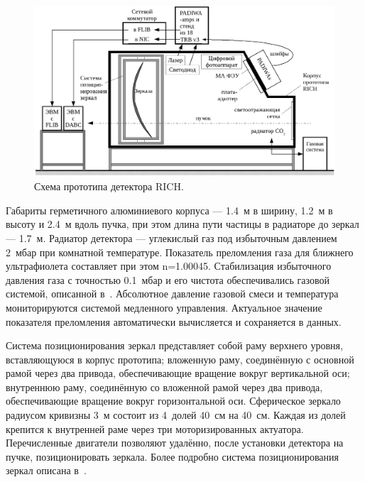 \begin{figure}[H]
\includegraphics[width=1.0\textwidth]{pictures/10_Beamtime_setup_RICH_text.png}
\caption{Схема прототипа детектора RICH.}
\label{fig:Prototype}
\end{figure}

Габариты герметичного алюминиевого корпуса --- 1.4~м в ширину, 1.2~м в высоту и 2.4~м вдоль пучка, при этом длина пути частицы в радиаторе до зеркал --- 1.7~м. Радиатор детектора --- углекислый газ под избыточным давлением 2~мбар при комнатной температуре. Показатель преломления газа для ближнего ультрафиолета составляет при этом n=1.00045. Стабилизация избыточного давления газа с точностью 0.1~мбар и его чистота обеспечивались газовой системой, описанной в~\cite{GASSYS}. Абсолютное давление газовой смеси и температура мониторируются системой медленного управления. Актуальное значение показателя преломления автоматически вычисляется и сохраняется в данных.

Система позиционирования зеркал представляет собой раму верхнего уровня, вставляющуюся в корпус прототипа; вложенную раму, соединённую с основной рамой через два привода, обеспечивающие вращение вокруг вертикальной оси; внутреннюю раму, соединённую со вложенной рамой через два привода, обеспечивающие вращение вокруг горизонтальной оси. Сферическое зеркало радиусом кривизны 3~м состоит из 4~долей 40~см на 40~см. Каждая из долей крепится к внутренней раме через три моторизированных актуатора. Перечисленные двигатели позволяют удалённо, после установки детектора на пучке, позиционировать зеркала. Более подробно система позиционирования зеркал описана в~\cite{MIRRORMIS}.

